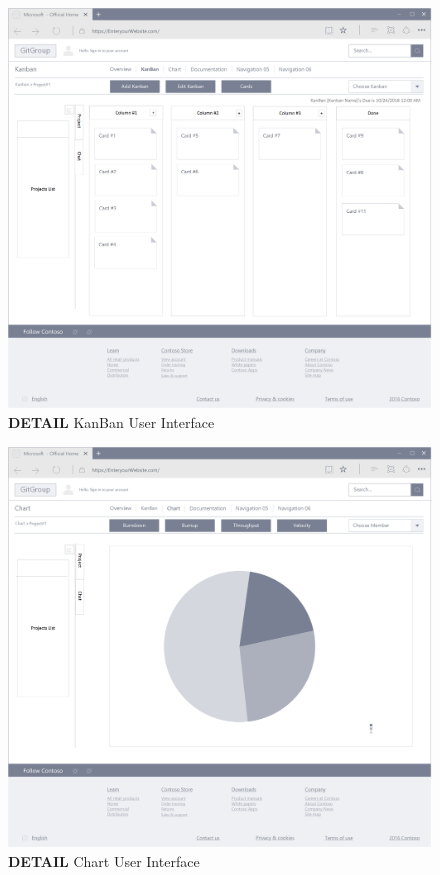 \documentclass[12pt,a4paper]{report}
\begin{document}
\begin{figure}[h]
	\centering
	\includegraphics[width=\textwidth]{./pics/KanbanInterface.png}
	\caption{\textbf{DETAIL} KanBan User Interface}
\end{figure}

\begin{figure}[h]
	\centering
	\includegraphics[width=\textwidth]{./pics/ChartInterface.png}
	\caption{\textbf{DETAIL} Chart User Interface}
\end{figure}
\end{document}
